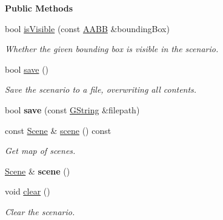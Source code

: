 \begin{Indent}\textbf{ Public Methods}\par
\begin{DoxyCompactItemize}
\item 
\mbox{\label{classrev_1_1_scenario_aa319e036de65f1103fd4f7b087bbae6f}} 
bool \mbox{\hyperlink{classrev_1_1_scenario_aa319e036de65f1103fd4f7b087bbae6f}{is\+Visible}} (const \mbox{\hyperlink{classrev_1_1_a_a_b_b}{A\+A\+BB}} \&bounding\+Box)
\begin{DoxyCompactList}\small\item\em Whether the given bounding box is visible in the scenario. \end{DoxyCompactList}\item 
\mbox{\label{classrev_1_1_scenario_ace58fa0ddfb74ab61cbc94fcd96c69d0}} 
bool \mbox{\hyperlink{classrev_1_1_scenario_ace58fa0ddfb74ab61cbc94fcd96c69d0}{save}} ()
\begin{DoxyCompactList}\small\item\em Save the scenario to a file, overwriting all contents. \end{DoxyCompactList}\item 
\mbox{\label{classrev_1_1_scenario_ac097d572b3bd08569f1e2916900a728d}} 
bool {\bfseries save} (const \mbox{\hyperlink{classrev_1_1_g_string}{G\+String}} \&filepath)
\item 
\mbox{\label{classrev_1_1_scenario_a26b39b4561f928b2582c83e81d42b8d0}} 
const \mbox{\hyperlink{classrev_1_1_scene}{Scene}} \& \mbox{\hyperlink{classrev_1_1_scenario_a26b39b4561f928b2582c83e81d42b8d0}{scene}} () const
\begin{DoxyCompactList}\small\item\em Get map of scenes. \end{DoxyCompactList}\item 
\mbox{\label{classrev_1_1_scenario_a387ecaadf918186f4a6a83dcbebc959a}} 
\mbox{\hyperlink{classrev_1_1_scene}{Scene}} \& {\bfseries scene} ()
\item 
\mbox{\label{classrev_1_1_scenario_a5cd569d90123d785264669cab72be224}} 
void \mbox{\hyperlink{classrev_1_1_scenario_a5cd569d90123d785264669cab72be224}{clear}} ()
\begin{DoxyCompactList}\small\item\em Clear the scenario. \end{DoxyCompactList}\end{DoxyCompactItemize}
\end{Indent}
